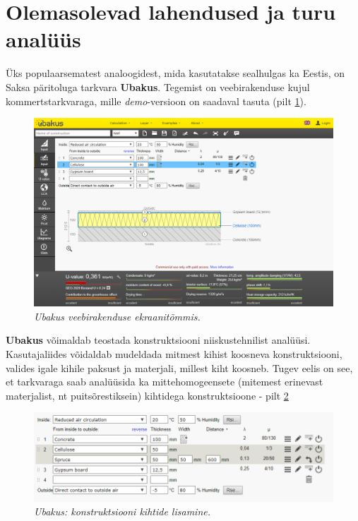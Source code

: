 \section{Olemasolevad lahendused ja turu analüüs}
Üks populaarsematest analoogidest, mida kasutatakse sealhulgas ka Eestis, on Saksa päritoluga tarkvara \textbf{Ubakus}. 
Tegemist on veebirakenduse kujul kommertstarkvaraga, mille \textit{demo}-versioon on saadaval tasuta (pilt \ref{fig:ubakus_sample}). 
\begin{figure}[ht]
    \centering
    \includegraphics[width=.8\textwidth]{figures/01_analogues/01_ubakus.png}
    \caption{\textit{Ubakus veebirakenduse ekraanitõmmis.}}
    \label{fig:ubakus_sample}
\end{figure}

\textbf{Ubakus} võimaldab teostada konstruktsiooni niiskustehnilist analüüsi. Kasutajaliides võidaldab 
mudeldada mitmest kihist koosneva konstruktsiooni, valides igale kihile paksust ja materjali, millest 
kiht koosneb. Tugev eelis on see, et tarkvaraga saab analüüsida ka mittehomogeensete (mitemest erinevast 
materjalist, nt puitsõrestiksein) kihtidega konstruktsioone - pilt \ref{fig:ubakus_layers}

\begin{figure}[ht]
    \centering
    \includegraphics[width=.6\textwidth]{figures/01_analogues/02_ubakus_layers.png}
    \caption{\textit{Ubakus: konstruktsiooni kihtide lisamine.}}
    \label{fig:ubakus_layers}
\end{figure}

